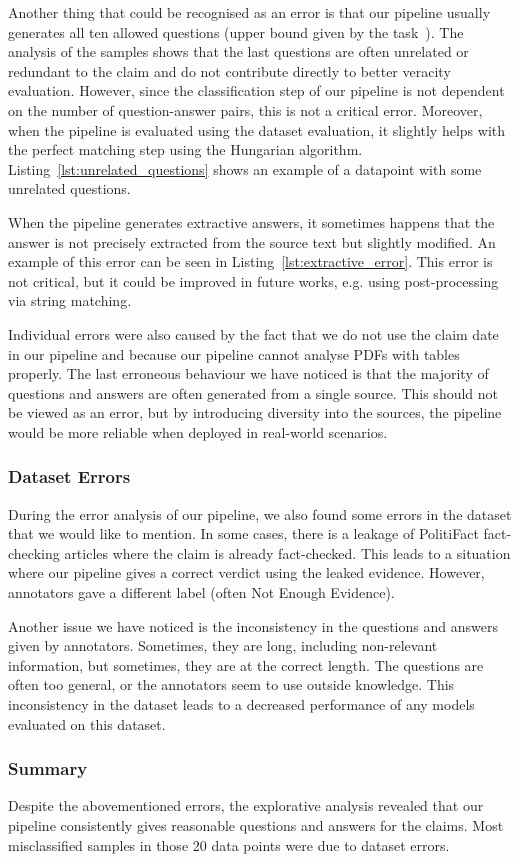 Another thing that could be recognised as an error is that our pipeline usually generates all ten allowed questions (upper bound given by the task~\cite{averitec2024}). The analysis of the samples shows that the last questions are often unrelated or redundant to the claim and do not contribute directly to better veracity evaluation. However, since the classification step of our pipeline is not dependent on the number of question-answer pairs, this is not a critical error. Moreover, when the pipeline is evaluated using the \averitec{} dataset evaluation, it slightly helps with the perfect matching step using the Hungarian algorithm. Listing~\ref{lst:unrelated_questions} shows an example of a datapoint with some unrelated questions.

When the pipeline generates extractive answers, it sometimes happens that the answer is not precisely extracted from the source text but slightly modified. An example of this error can be seen in Listing~\ref{lst:extractive_error}. This error is not critical, but it could be improved in future works, e.g. using post-processing via string matching.

Individual errors were also caused by the fact that we do not use the claim date in our pipeline and because our pipeline cannot analyse PDFs with tables properly. The last erroneous behaviour we have noticed is that the majority of questions and answers are often generated from a single source. This should not be viewed as an error, but by introducing diversity into the sources, the pipeline would be more reliable when deployed in real-world scenarios.

\subsubsection{Dataset Errors}
During the error analysis of our pipeline, we also found some errors in the \averitec{} dataset that we would like to mention. In some cases, there is a leakage of PolitiFact fact-checking articles where the claim is already fact-checked. This leads to a situation where our pipeline gives a correct verdict using the leaked evidence. However, annotators gave a different label (often Not Enough Evidence). 

Another issue we have noticed is the inconsistency in the questions and answers given by annotators. Sometimes, they are long, including non-relevant information, but sometimes, they are at the correct length. The questions are often too general, or the annotators seem to use outside knowledge. This inconsistency in the dataset leads to a decreased performance of any models evaluated on this dataset.

\subsubsection{Summary}
Despite the abovementioned errors, the explorative analysis revealed that our pipeline consistently gives reasonable questions and answers for the claims. Most misclassified samples in those 20 data points were due to dataset errors.

